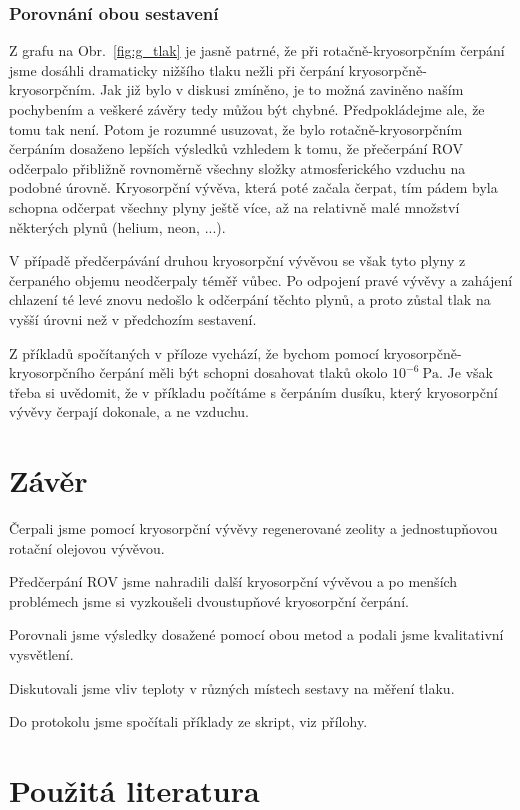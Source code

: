 \documentclass[english]{article}
\newcommand{\unit}[1]{~\mathrm{#1}}
\begin{document}
	\subsubsection{Porovnání obou sestavení}
		Z grafu na Obr.~\ref{fig:g_tlak} je jasně patrné, že při rotačně-kryosorpčním čerpání jsme dosáhli dramaticky nižšího tlaku nežli při čerpání kryosorpčně-kryosorpčním. Jak již bylo v diskusi zmíněno, je to možná zaviněno naším pochybením a veškeré závěry tedy můžou být chybné. Předpokládejme ale, že tomu tak není. Potom je rozumné usuzovat, že bylo rotačně-kryosorpčním čerpáním dosaženo lepších výsledků vzhledem k tomu, že přečerpání ROV odčerpalo přibližně rovnoměrně všechny složky atmosferického vzduchu na podobné úrovně. Kryosorpční vývěva, která poté začala čerpat, tím pádem byla schopna odčerpat všechny plyny ještě více, až na relativně malé množství některých plynů (helium, neon, ...). 
		
		V případě předčerpávání druhou kryosorpční vývěvou se však tyto plyny z čerpaného objemu neodčerpaly téměř vůbec. Po odpojení pravé vývěvy a zahájení chlazení té levé znovu nedošlo k odčerpání těchto plynů, a proto zůstal tlak na vyšší úrovni než v předchozím sestavení.
		
		Z příkladů spočítaných v příloze vychází, že bychom pomocí kryosorpčně-kryosorpčního čerpání měli být schopni dosahovat tlaků okolo $10^{-6}\unit{Pa}$. Je však třeba si uvědomit, že v příkladu počítáme s čerpáním dusíku, který kryosorpční vývěvy čerpají dokonale, a ne vzduchu.
						
\section{Závěr}
	Čerpali jsme pomocí kryosorpční vývěvy regenerované zeolity a jednostupňovou rotační olejovou vývěvou.
	
	Předčerpání ROV jsme nahradili další kryosorpční vývěvou a po menších problémech jsme si vyzkoušeli dvoustupňové kryosorpční čerpání.
	
	Porovnali jsme výsledky dosažené pomocí obou metod a podali jsme kvalitativní vysvětlení.
	
	Diskutovali jsme vliv teploty v různých místech sestavy na měření tlaku.
	
	Do protokolu jsme spočítali příklady ze skript, viz přílohy.

	
\section {Použitá literatura}
\begingroup
\renewcommand{\section}[2]{}
\end{document}
